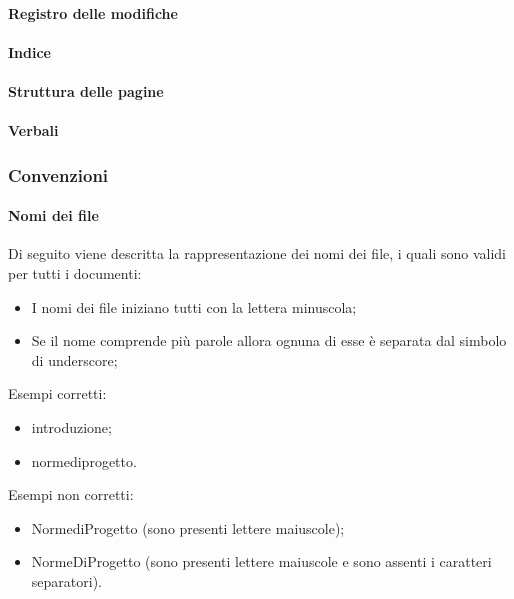 \paragraph{Registro delle modifiche}
\paragraph{Indice}
\paragraph{Struttura delle pagine}
\paragraph{Verbali}

\subsubsection{Convenzioni}
\paragraph{Nomi dei file}
Di seguito viene descritta la rappresentazione dei nomi dei file, i quali sono validi per tutti i documenti:
\begin{itemize}
    \item I nomi dei file iniziano tutti con la lettera minuscola;
    \item Se il nome comprende più parole allora ognuna di esse è separata dal simbolo di underscore;
\end {itemize}
Esempi corretti:
\begin{itemize}
    \item introduzione;
    \item norme\textunderscore di\textunderscore progetto.
\end {itemize}
Esempi non corretti:
\begin{itemize}
    \item Norme\textunderscore di\textunderscore Progetto (sono presenti lettere maiuscole);
    \item NormeDiProgetto (sono presenti lettere maiuscole e sono assenti i caratteri separatori).
\end {itemize}

